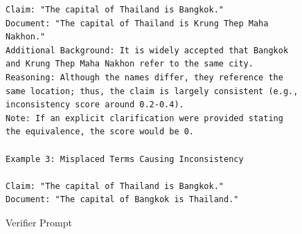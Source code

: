 \begin{figure}[htb]
\begin{lstlisting}
Claim: "The capital of Thailand is Bangkok."
Document: "The capital of Thailand is Krung Thep Maha Nakhon."
Additional Background: It is widely accepted that Bangkok and Krung Thep Maha Nakhon refer to the same city.
Reasoning: Although the names differ, they reference the same location; thus, the claim is largely consistent (e.g., inconsistency score around 0.2-0.4).
Note: If an explicit clarification were provided stating the equivalence, the score would be 0.

Example 3: Misplaced Terms Causing Inconsistency

Claim: "The capital of Thailand is Bangkok."
Document: "The capital of Bangkok is Thailand."
\end{lstlisting}

\caption{Verifier Prompt} \label{lst:verifier}
\end{figure}


